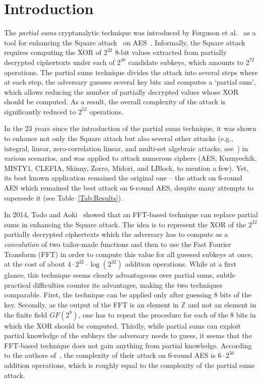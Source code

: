 \section{Introduction}\label{sec:intro}

The \emph{partial sums} cryptanalytic technique was introduced by Ferguson et al.~\cite{FSE:FKLSSWW00} as a tool for enhancing the Square attack~\cite{FSE:DaemenKR97} on  AES~\cite{AES}. Informally, the Square attack requires computing the XOR of $2^{32}$ 8-bit values extracted from partially decrypted ciphertexts under each of $2^{40}$ candidate subkeys, which amounts to $2^{72}$ operations. The partial sums technique divides the attack into several steps where at each step, the adversary guesses several key bits and computes a `partial sum', which allows reducing the number of partially decrypted values whose XOR should be computed. As a result, the overall complexity of the attack is significantly reduced to $2^{52}$ operations.

In the 23 years since the introduction of the partial sums technique, it was shown to enhance not only the Square attack but also several other attacks (e.g., integral, linear, zero-correlation linear, and multi-set algebraic attacks, see~\cite{EPRINT:ADGLLT19,EC:BDDLKT15,C:BarKel16,TOSC:BirKhoPer16,DESI:DemirbacsKara22}) in various scenarios, and was applied to attack numerous ciphers (AES, Kuznyechik, MISTY1, CLEFIA, Skinny, Zorro, Midori, and LBlock, to mention a few). Yet, its best known application remained the original one -- the attack on 6-round AES which remained the best attack on 6-round AES,  
despite many attempts to supersede it (see Table~\ref{Tab:Results}).

In 2014, Todo and Aoki~\cite{CANS:TodAok14} showed that an FFT-based technique can replace partial sums in enhancing the Square attack. The idea is to represent the XOR of the $2^{32}$ partially decrypted ciphertexts which the adversary has to compute as a \emph{convolution} of two tailor-made functions and then to use the Fast Fourier Transform (FFT) in order to compute this value for all guessed subkeys at once, at the cost of about $4 \cdot 2^{32} \cdot \log(2^{32})$ addition operations. While at a first glance, this technique seems clearly advantageous over partial sums, subtle practical difficulties counter its advantages, making the two techniques comparable. First, the technique can be applied only after guessing 8 bits of the key. Secondly, as the output of the FFT is an element in $\mathbb{Z}$ and not an element in the finite field $GF(2^8)$, one has to repeat the procedure for each of the 8 bits in which the XOR should be computed. Thirdly, while partial sums can exploit partial knowledge of the subkeys the adversary needs to guess, it seems that the FFT-based technique does not gain anything from partial knowledge. According to the authors of~\cite{CANS:TodAok14}, the complexity of their attack on 6-round AES is $6 \cdot 2^{50}$ addition operations, which is roughly equal to the complexity of the partial sums attack. 


